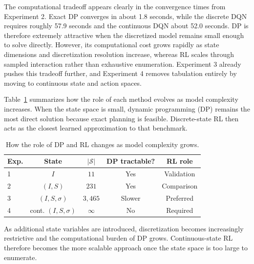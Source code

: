 \documentclass[11pt,a4paper]{article}
\begin{document}
The computational tradeoff appears clearly in the convergence times from Experiment 2. Exact DP converges in about 1.8 seconds, while the discrete DQN requires roughly 57.9 seconds and the continuous DQN about 52.0 seconds. DP is therefore extremely attractive when the discretized model remains small enough to solve directly. However, its computational cost grows rapidly as state dimensions and discretization resolution increase, whereas RL scales through sampled interaction rather than exhaustive enumeration. Experiment 3 already pushes this tradeoff further, and Experiment 4 removes tabulation entirely by moving to continuous state and action spaces.

\begin{table}[htbp]
\centering
\begin{minipage}{0.33\textwidth}

Table~\ref{tab:tractability} summarizes how the role of each method evolves as model complexity increases. When the state space is small, dynamic programming (DP) remains the most direct solution because exact planning is feasible. Discrete-state RL then acts as the closest learned approximation to that benchmark.


\end{minipage}
\hfill
\begin{minipage}{0.65\textwidth}
\centering
\begin{tabular}{lcccc}
\toprule
Exp. & State & $|\mathcal{S}|$ & DP tractable? & RL role \\
\midrule
1 & $I$ & $11$ & Yes & Validation\\
2 & $(I,S)$ & $231$ & Yes & Comparison \\
3 & $(I,S,\sigma)$ & $3{,}465$ & Slower & Preferred\\
4 & cont. $(I,S,\sigma)$ & $\infty$ & No & Required \\
\bottomrule
\end{tabular}
\caption{How the role of DP and RL changes as model complexity grows.}
\label{tab:tractability}
\end{minipage}
\end{table}

As additional state variables are introduced, discretization becomes increasingly restrictive and the computational burden of DP grows. Continuous-state RL therefore becomes the more scalable approach once the state space is too large to enumerate.
\end{document}
